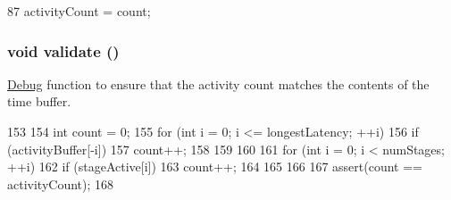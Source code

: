 \begin{DoxyCode}
87     { activityCount = count; }
\end{DoxyCode}
\hypertarget{classActivityRecorder_a41d45236c37b75848f4b1667a11fb50e}{
\subsubsection[{validate}]{\setlength{\rightskip}{0pt plus 5cm}void validate ()}}
\label{classActivityRecorder_a41d45236c37b75848f4b1667a11fb50e}
\hyperlink{namespaceDebug}{Debug} function to ensure that the activity count matches the contents of the time buffer. 


\begin{DoxyCode}
153 {
154     int count = 0;
155     for (int i = 0; i <= longestLatency; ++i) {
156         if (activityBuffer[-i]) {
157             count++;
158         }
159     }
160 
161     for (int i = 0; i < numStages; ++i) {
162         if (stageActive[i]) {
163             count++;
164         }
165     }
166 
167     assert(count == activityCount);
168 }
\end{DoxyCode}


